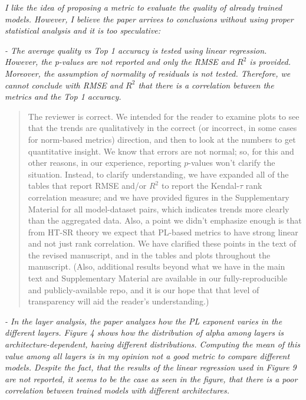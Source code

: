 \documentclass[11pt]{article}
\begin{document}
\noindent
\emph{%
I like the idea of proposing a metric to evaluate the quality of already trained models. 
However, I believe the paper arrives to conclusions without using proper statistical analysis and it is too speculative:
}

\noindent
\emph{%
- The average quality vs Top 1 accuracy is tested using linear regression. However, the p-values are not reported and only the RMSE and $R^2$ is provided. Moreover, the assumption of normality of residuals is not tested. Therefore, we cannot conclude with RMSE and $R^2$ that there is a correlation between the metrics and the Top 1 accuracy.
}

\begin{quote}
The reviewer is correct.  
We intended for the reader to examine plots to see that the trends are qualitatively in the correct (or incorrect, in some cases for norm-based metrics) direction, and then to look at the numbers to get quantitative insight.
We know that errors are not normal; so, for this and other reasons, in our experience, reporting $p$-values won't clarify the situation.
Instead, to clarify understanding, we have expanded all of the tables that report RMSE and/or $R^2$ to report the Kendal-$\tau$ rank correlation measure; and we have provided figures in the Supplementary Material for all model-dataset pairs, which indicates trends more clearly than the aggregated data.
Also, a point we didn't emphasize enough is that from HT-SR theory we expect that PL-based metrics to have strong linear and not just rank correlation.
We have clarified these points 
in the text 
of the revised manuscript, and in the tables and plots throughout the manuscript.
(Also, additional results beyond what we have in the main text and Supplementary Material are available in our fully-reproducible and publicly-available repo, and it is our hope that that level of transparency will aid the reader's understanding.)
\end{quote}

\noindent
\emph{%
- In the layer analysis, the paper analyzes how the PL exponent varies in the different layers. Figure 4 shows how the distribution of alpha among layers is architecture-dependent, having different distributions. Computing the mean of this value among all layers is in my opinion not a good metric to compare different models. Despite the fact, that the results of the linear regression used in Figure 9 are not reported, it seems to be the case as seen in the figure, that there is a poor correlation between trained models with different architectures.
}
\end{document}
